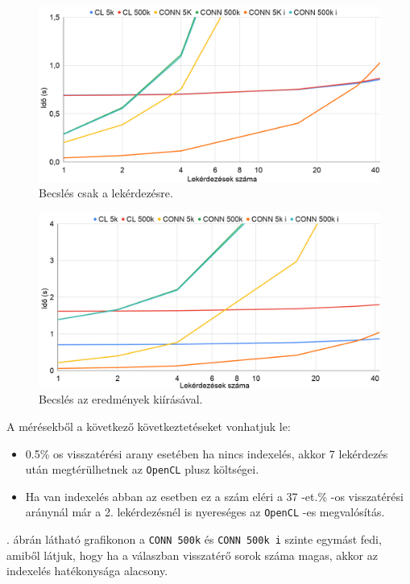 \begin{figure}[h!]
\centering
\includegraphics[width=\textwidth]{images/test/where.png}
\caption{Becslés csak a lekérdezésre.}
\label{fig:where}
\end{figure}

\begin{figure}[h!]
\centering
\includegraphics[width=\textwidth]{images/test/where_write.png}
\caption{Becslés az eredmények kiírásával.}
\label{fig:where_write}
\end{figure}

A mérésekből a következő következtetéseket vonhatjuk le:
\begin{itemize}
	\item 0.5\% os visszatérési arany esetében ha nincs indexelés, akkor 7 lekérdezés után megtérülhetnek az \texttt{OpenCL} plusz költségei.
	\item Ha van indexelés abban az esetben ez a szám eléri a 37 -et.\% -os visszatérési aránynál már a 2. lekérdezésnél is nyereséges az \texttt{OpenCL} -es megvalósítás. 
\end{itemize}

. ábrán látható grafikonon a \texttt{CONN 500k} és \texttt{CONN 500k i} szinte egymást fedi, amiből látjuk, hogy ha a válaszban visszatérő sorok száma magas, akkor az indexelés hatékonysága alacsony.

